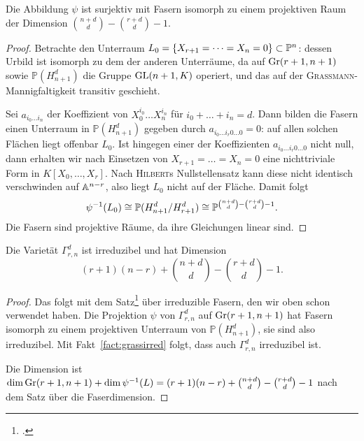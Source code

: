 \begin{prop}
Die Abbildung $\psi$ ist surjektiv mit Fasern isomorph zu einem projektiven Raum der Dimension $\binom{n+d}d - \binom{r+d}d - 1$.
\end{prop}
\begin{proof}
Betrachte den Unterraum $L_0 = \{X_{r+1} = \dots = X_n = 0\} \subset \mathbb P^{n}$: dessen Urbild ist isomorph zu dem der anderen Unterräume, da auf $\grass r+1/{n+1}$ sowie $\mathbb P(H_{n+1}^d)$ die Gruppe $\mathrm{GL}(n+1,K)$ operiert, und das auf der \textsc{Grassmann}-Mannigfaltigkeit transitiv geschieht.

Sei $a_{i_0 \dots i_n}$ der Koeffizient von $X_0^{i_0} \dots X_n^{i_n}$ für $i_0 + \dots + i_n = d$. Dann bilden die Fasern einen Unterraum in $\mathbb P(H_{n+1}^d)$ gegeben durch $a_{i_0 \dots i_r 0 \dots 0} = 0$: auf allen solchen Flächen liegt offenbar $L_0$. Ist hingegen einer der Koeffizienten $a_{i_0 \dots i_r 0 \dots 0}$ nicht null, dann erhalten wir nach Einsetzen von $X_{r+1} = \dots = X_n = 0$ eine nichttriviale Form in $K[X_0, \dots, X_r]$. Nach \textsc{Hilbert}s Nullstellensatz kann diese nicht identisch verschwinden auf $\mathbb A^{n-r}$, also liegt $L_0$ nicht auf der Fläche. Damit folgt
\begin{equation*}
\psi^{-1}(L_0) \cong \mathbb P(H_{n+1}^d / H_{r+1}^d) \cong \mathbb P^{\binom{n+d}d - \binom{r+d}d - 1}.
\end{equation*}
Die Fasern sind projektive Räume, da ihre Gleichungen linear sind.
\end{proof}

\begin{coroll}
Die Varietät $\Gamma_{r,n}^d$ ist irreduzibel und hat Dimension
\begin{equation}
(r+1)(n-r) + \binom{n+d}d - \binom{r+d}d - 1.
\end{equation}
\end{coroll}
\begin{proof}
Das folgt mit dem Satz\footcite[S.~77, Theorem~8]{Shafarevich} über irreduzible Fasern, den wir oben schon verwendet haben. Die Projektion $\psi$ von $\Gamma_{r,n}^d$ auf $\grass r+1/{n+1}$ hat Fasern isomorph zu einem projektiven Unterraum von $\mathbb P(H_{n+1}^d)$, sie sind also irreduzibel. Mit Fakt~\ref{fact:grassirred} folgt, dass auch $\Gamma_{r,n}^d$ irreduzibel ist.

Die Dimension ist $\dim \grass r+1/{n+1} + \dim \psi^{-1}(L) = (r+1)(n-r) + \binom{n+d}d - \binom{r+d}d - 1$ nach dem Satz über die Faserdimension.
\end{proof}

